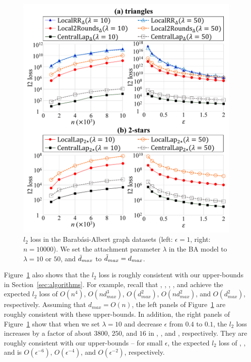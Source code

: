 \begin{figure}[t]
\centering
\includegraphics[width=0.99\linewidth]{fig/res6_BAGraph.pdf}
\vspace{-2mm}
\caption{$l_2$ loss in the Barab\'{a}si-Albert graph datasets 
(left: $\epsilon=1$, right: $n=10000$). 
We set the attachment parameter $\lambda$ in the BA model to $\lambda=10$ or $50$, and $\tilde{d}_{max}$ to $\tilde{d}_{max} = d_{max}$.}
\label{fig:res6_BAGraph}
\end{figure}

Figure~\ref{fig:res6_BAGraph} also shows that the $l_2$ loss is roughly consistent with our upper-bounds in Section~\ref{sec:algorithms}. 
For example, recall that , , , , and  achieve the expected $l_2$ loss of $O(n^4)$, $O(nd_{max}^3)$, $O(d_{max}^2)$, $O(nd_{max}^{2})$, and $O(d_{max}^{2})$, respectively. 
Assuming that $d_{max} = O(n)$, the left panels of Figure~\ref{fig:res6_BAGraph} are roughly consistent with these upper-bounds. 
In addition, the right panels of Figure~\ref{fig:res6_BAGraph} show that when we set $\lambda=10$ and decrease $\epsilon$ from $0.4$ to $0.1$, the $l_2$ loss increases by a factor of about $3800$, $250$, and $16$ in , , and , respectively. 
They are roughly consistent with our upper-bounds -- for small $\epsilon$, the expected $l_2$ loss of , , and  is  $O(\epsilon^{-6})$, $O(\epsilon^{-4})$, and $O(\epsilon^{-2})$, respectively.

